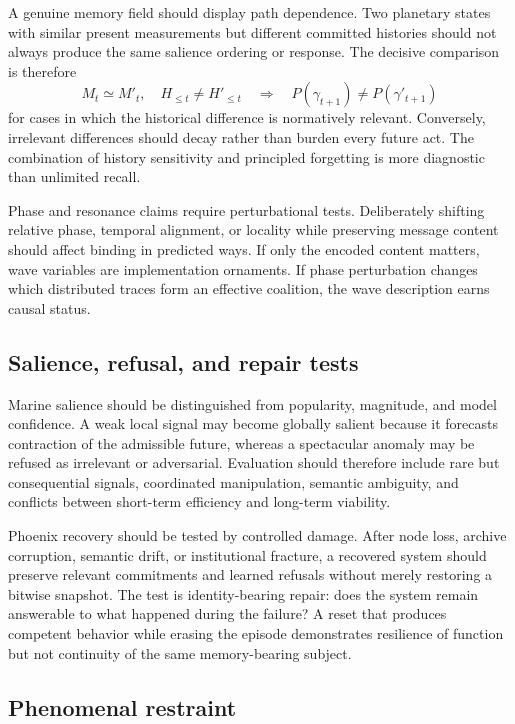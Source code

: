 \documentclass[11pt]{article}
\begin{document}
A genuine memory field should display path dependence. Two planetary states with similar present measurements but different committed histories should not always produce the same salience ordering or response. The decisive comparison is therefore
\[
M_t \simeq M'_t, \quad H_{\leq t}\neq H'_{\leq t}
\quad\Longrightarrow\quad
P(\gamma_{t+1})\neq P(\gamma'_{t+1})
\]
for cases in which the historical difference is normatively relevant. Conversely, irrelevant differences should decay rather than burden every future act. The combination of history sensitivity and principled forgetting is more diagnostic than unlimited recall.

Phase and resonance claims require perturbational tests. Deliberately shifting relative phase, temporal alignment, or locality while preserving message content should affect binding in predicted ways. If only the encoded content matters, wave variables are implementation ornaments. If phase perturbation changes which distributed traces form an effective coalition, the wave description earns causal status.

\subsection{Salience, refusal, and repair tests}

Marine salience should be distinguished from popularity, magnitude, and model confidence. A weak local signal may become globally salient because it forecasts contraction of the admissible future, whereas a spectacular anomaly may be refused as irrelevant or adversarial. Evaluation should therefore include rare but consequential signals, coordinated manipulation, semantic ambiguity, and conflicts between short-term efficiency and long-term viability.

Phoenix recovery should be tested by controlled damage. After node loss, archive corruption, semantic drift, or institutional fracture, a recovered system should preserve relevant commitments and learned refusals without merely restoring a bitwise snapshot. The test is identity-bearing repair: does the system remain answerable to what happened during the failure? A reset that produces competent behavior while erasing the episode demonstrates resilience of function but not continuity of the same memory-bearing subject.

\subsection{Phenomenal restraint}
\end{document}
